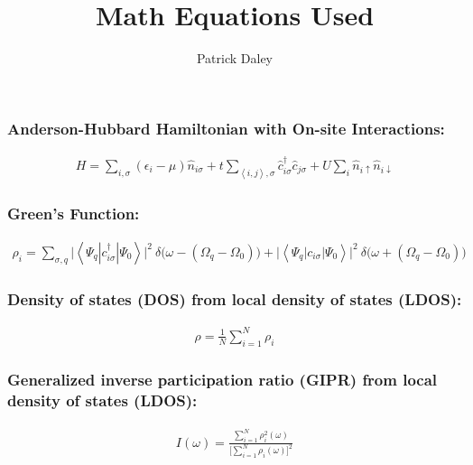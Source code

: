 \documentclass{article}
\title{Math Equations Used}
\author{Patrick Daley}
\def\exp#1{\left<#1\right>}
\begin{document}
\maketitle

\subsubsection*{Anderson-Hubbard Hamiltonian with On-site Interactions:}
\begin{align}
	H = \sum_{i,\sigma} (\epsilon_i - \mu)\hat{n}_{i \sigma} + t\sum_{\exp{i,j},\sigma} \hat{c}_{i\sigma}^{\dagger}\hat{c}_{j\sigma} + U\sum_{i}\hat{n}_{i \uparrow}\hat{n}_{i \downarrow}
\end{align}
\subsubsection*{Green's Function: }
\begin{align}
\rho_i = \sum_{\sigma,q}\big| \exp{\Psi_{q}|c_{i\sigma}^{\dagger}|\Psi_0}\big|^2 \ \delta \big(\omega - (\Omega_q - \Omega_0)\big) + \big|\exp{\Psi_{q}|c_{i\sigma}|\Psi_0}\big|^2 \ \delta \big(\omega + (\Omega_q - \Omega_0)\big) 
\end{align}
\subsubsection*{Density of states (DOS) from local density of states (LDOS):}
\begin{align}
\rho = \frac{1}{N} \sum_{i=1}^{N} \rho_i
\end{align}
\subsubsection*{Generalized inverse participation ratio (GIPR) from local density of states (LDOS):}
\begin{align}
I(\omega)= \frac{ \sum_{i=1}^{N} \rho_i^2(\omega)}{\big[ \sum_{i=1}^{N} \rho_i(\omega) \big]^2}
\end{align}
\end{document}
